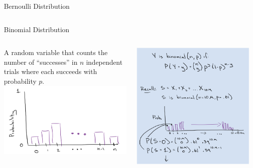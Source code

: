 \documentclass[aspectratio=169]{../latex_main/tntbeamer}  %
\begin{document}
\begin{frame}[c]{Bernoulli Distribution}
\begin{columns}
\begin{column}{.52\textwidth}
	        \end{column}
	    \end{columns}
	\end{frame}
	
	
	\begin{frame}[c]{Binomial Distribution}
	    \begin{columns}
	        \begin{column}{.4\textwidth}
	             A random variable that counts the number of “successes” in \alert{$n$} independent trials where each succeeds with probability $p$.\\

	                 \centering
	                 \includegraphics[scale=.5]{Bild19}

	        \end{column}
	        
	        \begin{column}{.4\textwidth}

	             \centering
	             \includegraphics[scale=.5]{Bild18}

	        \end{column}
	    \end{columns}
	\end{frame}
\end{document}
